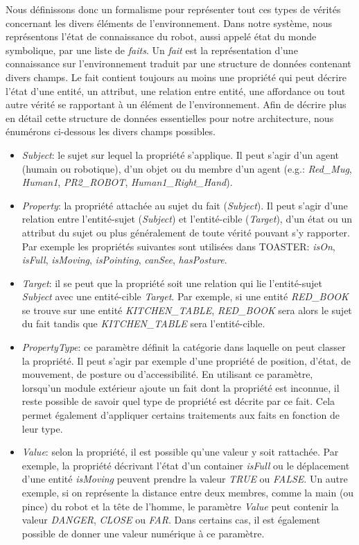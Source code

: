 \documentclass[a4paper,11pt,twoside]{StyleThese}
\begin{document}
Nous définissons donc un formalisme pour représenter tout ces types de vérités concernant les divers éléments de l'environnement.
Dans notre système, nous représentons l'état de connaissance du robot, aussi appelé état du monde symbolique, par une liste de \textit{faits}. Un \textit{fait} est la représentation d'une connaissance sur l'environnement traduit par une structure de données contenant divers champs. Le fait contient toujours au moins une propriété qui peut décrire l'état d'une entité, un attribut, une relation entre entité, une affordance ou tout autre vérité se rapportant à un élément de l'environnement.
Afin de décrire plus en détail cette structure de données essentielles pour notre architecture, nous énumérons ci-dessous les divers champs possibles. 

\begin{itemize}
\item \textit{Subject}: le sujet sur lequel la propriété s'applique. Il peut s'agir d'un agent (humain ou robotique), d'un objet ou du membre d'un agent (e.g.: \textit{Red\_Mug}, \textit{Human1}, \textit{PR2\_ROBOT}, \textit{Human1\_Right\_Hand}).
\item \textit{Property}: la propriété attachée au sujet du fait (\textit{Subject}). Il peut s'agir d'une relation entre l'entité-sujet (\textit{Subject}) et l'entité-cible (\textit{Target}), d'un état ou un attribut du sujet ou plus généralement de toute vérité pouvant s'y rapporter.  Par exemple les propriétés suivantes sont utilisées dans TOASTER: \textit{isOn}, \textit{isFull}, \textit{isMoving}, \textit{isPointing}, \textit{canSee}, \textit{hasPosture}.
\item \textit{Target}: il se peut que la propriété soit une relation qui lie l'entité-sujet \textit{Subject} avec une entité-cible \textit{Target}. Par exemple, si une entité \textit{RED\_BOOK} se trouve sur une entité \textit{KITCHEN\_TABLE}, \textit{RED\_BOOK} sera alors le sujet du fait tandis que \textit{KITCHEN\_TABLE} sera l'entité-cible.
\item \textit{PropertyType}: ce paramètre définit la catégorie dans laquelle on peut classer la propriété. Il peut s'agir par exemple d'une propriété de position, d'état, de mouvement, de posture ou d'accessibilité. En utilisant ce paramètre, lorsqu'un module extérieur ajoute un fait dont la propriété est inconnue, il reste possible de savoir quel type de propriété est décrite par ce fait. Cela permet également d'appliquer certains traitements aux faits en fonction de leur type.
\item \textit{Value}: selon la propriété, il est possible qu'une valeur y soit rattachée. Par exemple, la propriété décrivant l'état d'un container \textit{isFull} ou le déplacement d'une entité \textit{isMoving} peuvent prendre la valeur \textit{TRUE} ou \textit{FALSE}. Un autre exemple, si on représente la distance entre deux membres, comme la main (ou pince) du robot et la tête de l'homme, le paramètre \textit{Value} peut contenir la valeur \textit{DANGER}, \textit{CLOSE} ou \textit{FAR}. Dans certains cas, il est également possible de donner une valeur numérique à ce paramètre.

\end{itemize}
\end{document}
